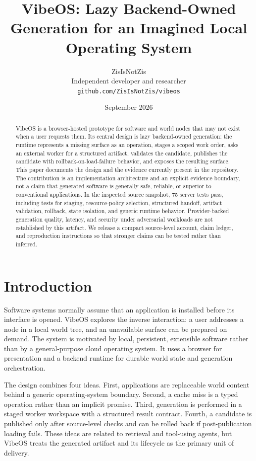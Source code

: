 \documentclass[11pt]{article}
\title{VibeOS: Lazy Backend-Owned Generation for an Imagined Local Operating System}
\author{ZisIsNotZis\\Independent developer and researcher\\\texttt{github.com/ZisIsNotZis/vibeos}}
\date{September 2026}
\begin{document}
\maketitle

\begin{abstract}
VibeOS is a browser-hosted prototype for software and world nodes that may not exist when a user requests them. Its central design is lazy backend-owned generation: the runtime represents a missing surface as an operation, stages a scoped work order, asks an external worker for a structured artifact, validates the candidate, publishes the candidate with rollback-on-load-failure behavior, and exposes the resulting surface. This paper documents the design and the evidence currently present in the repository. The contribution is an implementation architecture and an explicit evidence boundary, not a claim that generated software is generally safe, reliable, or superior to conventional applications. In the inspected source snapshot, 75 server tests pass, including tests for staging, resource-policy selection, structured handoff, artifact validation, rollback, state isolation, and generic runtime behavior. Provider-backed generation quality, latency, and security under adversarial workloads are not established by this artifact. We release a compact source-level account, claim ledger, and reproduction instructions so that stronger claims can be tested rather than inferred.
\end{abstract}

\section{Introduction}
Software systems normally assume that an application is installed before its interface is opened. VibeOS explores the inverse interaction: a user addresses a node in a local world tree, and an unavailable surface can be prepared on demand. The system is motivated by local, persistent, extensible software rather than by a general-purpose cloud operating system. It uses a browser for presentation and a backend runtime for durable world state and generation orchestration.

The design combines four ideas. First, applications are replaceable world content behind a generic operating-system boundary. Second, a cache miss is a typed operation rather than an implicit promise. Third, generation is performed in a staged worker workspace with a structured result contract. Fourth, a candidate is published only after source-level checks and can be rolled back if post-publication loading fails. These ideas are related to retrieval and tool-using agents, but VibeOS treats the generated artifact and its lifecycle as the primary unit of delivery.
\end{document}
